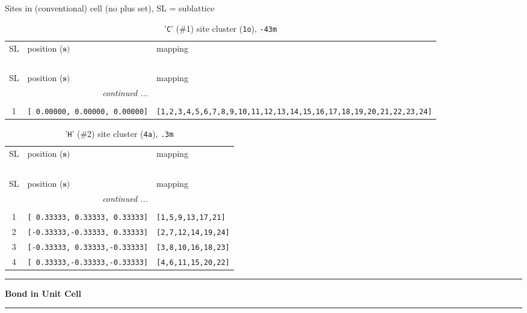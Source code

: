\documentclass[fleqn,10pt,landscape]{jsarticle}
\begin{document}
\noindent Sites in (conventional) cell (no plus set), SL = sublattice

\renewcommand{\arraystretch}{1.6}
\begin{longtable}[l]{cll}
\captionsetup{justification=raggedright, singlelinecheck=off}
\caption{'\texttt{C}' (\#1) site cluster (\texttt{1o}), \texttt{-43m}}
 \\
 \hline \hline
SL & position ($\bm{s})$ & mapping \\ \hline \endfirsthead

\multicolumn{2}{l}{\tablename\ \thetable{}} \\
 \hline \hline
SL & position ($\bm{s})$ & mapping \\ \hline \endhead

 \hline \hline
\multicolumn{2}{r}{\footnotesize\it continued ...} \\ \endfoot

 \hline \hline
\multicolumn{2}{r}{} \\ \endlastfoot

1 & \texttt{[ 0.00000, 0.00000, 0.00000]} & \texttt{[1,2,3,4,5,6,7,8,9,10,11,12,13,14,15,16,17,18,19,20,21,22,23,24]} \\
\end{longtable}
\renewcommand{\arraystretch}{1.6}
\begin{longtable}[l]{cll}
\captionsetup{justification=raggedright, singlelinecheck=off}
\caption{'\texttt{H}' (\#2) site cluster (\texttt{4a}), \texttt{.3m}}
 \\
 \hline \hline
SL & position ($\bm{s})$ & mapping \\ \hline \endfirsthead

\multicolumn{2}{l}{\tablename\ \thetable{}} \\
 \hline \hline
SL & position ($\bm{s})$ & mapping \\ \hline \endhead

 \hline \hline
\multicolumn{2}{r}{\footnotesize\it continued ...} \\ \endfoot

 \hline \hline
\multicolumn{2}{r}{} \\ \endlastfoot

1 & \texttt{[ 0.33333, 0.33333, 0.33333]} & \texttt{[1,5,9,13,17,21]} \\ \hline
2 & \texttt{[-0.33333,-0.33333, 0.33333]} & \texttt{[2,7,12,14,19,24]} \\ \hline
3 & \texttt{[-0.33333, 0.33333,-0.33333]} & \texttt{[3,8,10,16,18,23]} \\ \hline
4 & \texttt{[ 0.33333,-0.33333,-0.33333]} & \texttt{[4,6,11,15,20,22]} \\
\end{longtable}
\vspace{5mm}
\noindent \rule[0.5mm]{5mm}{0.5mm}\hspace{3mm}\textbf{Bond in Unit Cell}\hspace{3mm}\leaders\hrule height 0.5mm\hfill\kern0pt
\vspace{3mm}
\end{document}
